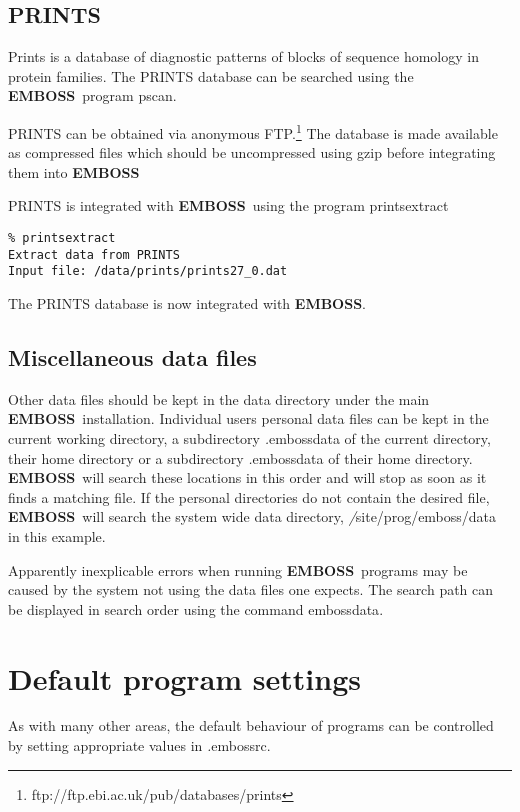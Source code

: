 \documentclass{report}
\newcommand{\filename}[1]{{\sf\textsl #1}}
\newcommand{\progname}[1]{{\sc #1}}
\newcommand{\EMBOSS}{{\sf\bfseries EMBOSS}}
\begin{document}
      \subsection{PRINTS}

Prints is a database of diagnostic patterns of blocks of sequence homology in protein families. The PRINTS database can be searched using the \EMBOSS\ program \progname{pscan}.

PRINTS can be obtained via anonymous FTP.\footnote{ftp://ftp.ebi.ac.uk/pub/databases/prints} The database is made available as compressed files which should be uncompressed using \progname{gzip} before integrating them into \EMBOSS\

PRINTS is integrated with \EMBOSS\ using the program \progname{printsextract}
\begin{verbatim}
% printsextract
Extract data from PRINTS
Input file: /data/prints/prints27_0.dat
\end{verbatim}
The PRINTS database is now integrated with \EMBOSS.

\subsection{Miscellaneous data files}

Other data files should be kept in the data directory under the main \EMBOSS\ installation. Individual users personal data files can be kept in the current working directory, a subdirectory \filename{.embossdata} of the current directory, their home directory or a subdirectory \filename{.embossdata} of their home directory. \EMBOSS\ will search these locations in this order and will stop as soon as it finds a matching file. If the personal directories do not contain the desired file, \EMBOSS\ will search the system wide data directory, \filename{/site/prog/emboss/data} in this example.

Apparently inexplicable errors when running \EMBOSS\ programs may be caused by the system not using the data files one expects. The search path can be displayed in search order using the command \progname{embossdata}.

\section{Default program settings}

As with many other areas, the default behaviour of programs can be controlled by setting appropriate values in \filename{.embossrc}.
\end{document}
